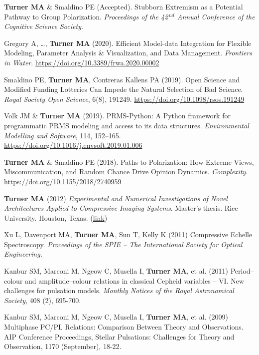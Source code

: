 \documentclass[letterpaper,11pt,oneside]{article}
\begin{document}
\begin{hangparas}{0.25in}{1}
  \textbf{Turner MA} \& Smaldino PE (Accepted). Stubborn Extremism as a Potential Pathway to Group Polarization. \emph{Proceedings of the 42$^{\,nd}$ Annual Conference of the Cognitive Science Society}.

    Gregory A, \ldots, \textbf{Turner MA} (2020). Efficient Model-data Integration for Flexible Modeling, Parameter Analysis \& Visualization, and Data Management. \emph{Frontiers in Water}. 
    \url{https://doi.org/10.3389/frwa.2020.00002}

    Smaldino PE, \textbf{Turner MA}, Contreras Kallens PA (2019). Open Science and Modified Funding Lotteries Can Impede the Natural Selection of Bad Science. \emph{Royal Society Open Science}, 6(8), 191249. \url{https://doi.org/10.1098/rsos.191249}

    Volk JM \& \textbf{Turner MA} (2019). PRMS-Python: A Python framework for programmatic PRMS modeling and access to its data structures. \emph{Environmental Modelling and Software}, 114, 152–165. \url{https://doi.org/10.1016/j.envsoft.2019.01.006}

    \textbf{Turner MA} \& Smaldino PE (2018). Paths to Polarization: How Extreme Views,
    Miscommunication, and Random Chance Drive Opinion Dynamics. \emph{Complexity}. \url{https://doi.org/10.1155/2018/2740959}
    
  \textbf{Turner MA} (2012) \emph{Experimental and Numerical Investigations of Novel Architectures Applied to Compressive Imaging Systems}. Master's thesis. Rice University. Houston, Texas. (\href{https://www.researchgate.net/publication/274720620_Experimental_and_Numerical_In vestigations_of_Novel_Architectures_Applied_to_Compressive_Imaging_Systems}{link})

    Xu L, Davenport MA, \textbf{Turner MA}, Sun T, Kelly K (2011) Compressive Echelle Spectroscopy. \emph{Proceedings of the SPIE – The International Society for Optical Engineering.}

    Kanbur SM, Marconi M, Ngeow C, Musella I, \textbf{Turner MA}, et al. (2011) Period–colour and amplitude–colour relations in classical Cepheid variables – VI. New challenges for pulsation models. \emph{Monthly Notices of the Royal Astronomical Society}, 408 (2), 695-700.

    Kanbur SM, Marconi M, Ngeow C, Musella I, \textbf{Turner MA}, et al. (2009) Multiphase PC/PL Relations: Comparison Between Theory and Observations. AIP Conference Proceedings, Stellar Pulsations: Challenges for Theory and Observation, 1170 (September), 18-22.
    
  \end{hangparas}
\end{document}
